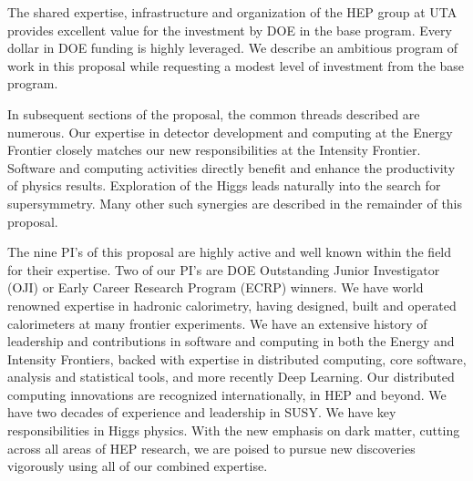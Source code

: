 The shared expertise, infrastructure and organization of the HEP group at UTA provides excellent value for the investment by DOE in the base program. Every dollar in DOE funding is highly leveraged. We describe an ambitious program of work in this proposal while requesting a modest level of investment from the base program.

In subsequent sections of the proposal, the common threads described are numerous. Our expertise in detector development and computing at the Energy Frontier closely matches our new responsibilities at the Intensity Frontier. Software and computing activities directly benefit and enhance the productivity of physics results. Exploration of the Higgs leads naturally into the search for supersymmetry. Many other such synergies are described in the remainder of this proposal.

The nine PI's of this proposal are highly active and well known within
the field for their expertise. Two of our PI's are DOE Outstanding
Junior Investigator (OJI) or Early Career Research Program (ECRP)
winners. We have world renowned expertise in hadronic calorimetry,
having designed, built and operated calorimeters at many frontier
experiments. We have an extensive history of leadership and
contributions in software and computing in both the Energy and
Intensity Frontiers, backed with expertise in distributed computing,
core software, analysis and statistical tools, and more recently Deep
Learning. Our distributed computing innovations are recognized
internationally, in HEP and beyond. We have two decades of experience
and leadership in SUSY. We have key responsibilities in Higgs
physics. With the new emphasis on dark matter, cutting across all
areas of HEP research, we are poised to pursue new discoveries
vigorously using all of our combined expertise.
%
